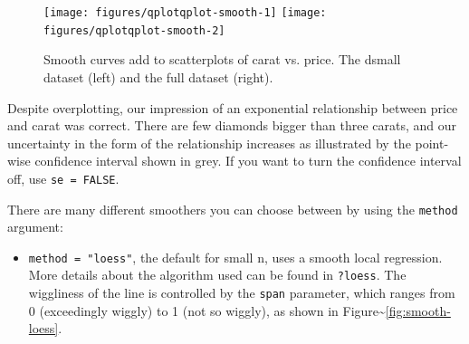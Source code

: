 \begin{Shaded}
\begin{Highlighting}[]
  \NormalTok{(}\NormalTok{, }\NormalTok{))}
  \NormalTok{(}\NormalTok{, }\NormalTok{))}
\end{Highlighting}
\end{Shaded}

\begin{figure}
\texttt{[image: figures/qplotqplot-smooth-1]} \texttt{[image: figures/qplotqplot-smooth-2]} \caption{Smooth curves add to scatterplots of carat vs. price. The dsmall dataset (left) and the full dataset (right).\label{fig:qplot-smooth}}
\end{figure}

Despite overplotting, our impression of an exponential relationship
between price and carat was correct. There are few diamonds bigger than
three carats, and our uncertainty in the form of the relationship
increases as illustrated by the point-wise confidence interval shown in
grey. If you want to turn the confidence interval off, use
\texttt{se = FALSE}.

There are many different smoothers you can choose between by using the
\texttt{method} argument:

\begin{itemize}
\itemsep1pt\parskip0pt
\item
  \texttt{method = "loess"}, the default for small n, uses a smooth
  local regression. More details about the algorithm used can be found
  in \texttt{?loess}. The wiggliness of the line is controlled by the
  \texttt{span} parameter, which ranges from 0 (exceedingly wiggly) to 1
  (not so wiggly), as shown in
  Figure\textasciitilde{}\ref{fig:smooth-loess}. 
\end{itemize}

\begin{Shaded}
\begin{Highlighting}[]
  \NormalTok{(}\NormalTok{, }\NormalTok{), }
   \NormalTok{)}
  \NormalTok{(}\NormalTok{, }\NormalTok{), }
   \NormalTok{)}
\end{Highlighting}
\end{Shaded}

